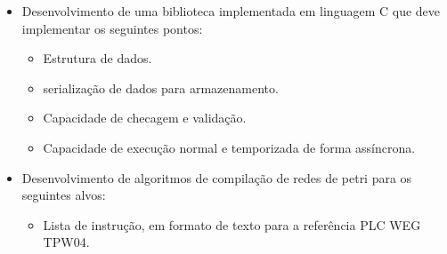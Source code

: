 \begin{itemize}
	\item Desenvolvimento de uma biblioteca implementada em linguagem C que deve implementar os seguintes pontos: 
	\begin{itemize}
		\item Estrutura de dados.
		\item serialização de dados para armazenamento.
		\item Capacidade de checagem e validação.
		\item Capacidade de execução normal e temporizada de forma assíncrona.
	\end{itemize}
	
	\item Desenvolvimento de algoritmos de compilação de redes de petri para os seguintes alvos:
	\begin{itemize}
		\item Lista de instrução, em formato de texto para a referência PLC WEG TPW04.
	\end{itemize}


\end{itemize}